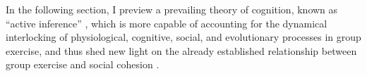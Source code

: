  In the following section, I  preview a prevailing theory of cognition, known as ``active inference'' \citep{Friston2010}, which is more
 capable of accounting for the dynamical interlocking of physiological, cognitive, social, and evolutionary processes in group exercise, and thus shed new light on the already established relationship between group exercise and social cohesion \citep{Cohen2017}.






